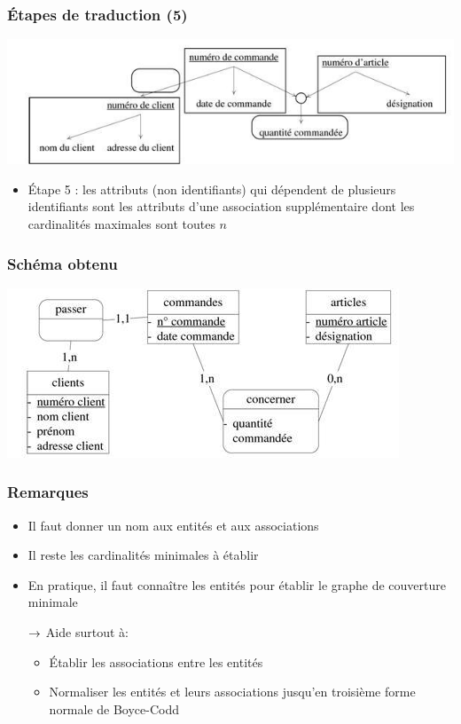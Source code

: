 \begin{frame}
  \frametitle{Étapes de traduction (5)}
  \begin{center}
    \includegraphics[width=0.9\linewidth]{graphe_identifie_5.jpg}
  \end{center}
  \begin{itemize}
    \item Étape 5 : les attributs (non identifiants) qui dépendent de plusieurs identifiants sont les
      attributs d'une association supplémentaire dont les cardinalités maximales sont toutes $n$
  \end{itemize}
\end{frame}

\begin{frame}
  \frametitle{Schéma obtenu}
  \begin{center}
    \includegraphics[width=0.9\linewidth]{schema_traduit.jpg}
  \end{center}
\end{frame}

\begin{frame}
  \frametitle{Remarques}
  \begin{itemize}
    \item Il faut donner un nom aux entités et aux associations
    \item Il reste les cardinalités minimales à établir
    \item En pratique, il faut connaître les entités pour établir le graphe de couverture minimale
    \item[$\rightarrow$] Aide surtout à:
      \begin{itemize}
        \item Établir les associations entre les entités
        \item Normaliser les entités et leurs associations jusqu'en troisième forme normale de Boyce-Codd 
      \end{itemize}
  \end{itemize}
\end{frame}

